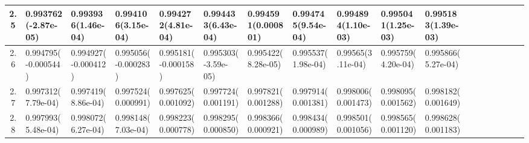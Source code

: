 \documentclass[
	article,			%
	12pt,				%
	twoside,			%
	a4paper,			%
	english,			%
	brazil,				%
	]{abntex2}
\begin{document}
\begin{landscape}
\begin{table}
\begin{tabular}{c||p{18mm}|p{18mm}|p{18mm}|p{18mm}|p{18mm}|p{18mm}|p{18mm}|p{18mm}|p{18mm}|p{18mm}|p{18mm}|p{18mm}|p{18mm}|p{18mm}|p{18mm}|p{18mm}|p{18mm}}
    			2.5 &0.993762\newline(-2.87e-05)&0.993936\newline(1.46e-04)&0.994106\newline(3.15e-04)&0.994272\newline(4.81e-04)&0.994433\newline(6.43e-04)&0.994591\newline(0.000801)&0.994745\newline(9.54e-04)&0.994894\newline(1.10e-03)&0.995041\newline(1.25e-03)&0.995183\newline(1.39e-03)\\\hline
    			2.6 & 0.994795\newline(-0.000544)&0.994927\newline(-0.000412)&0.995056\newline(-0.000283)&0.995181\newline(-0.000158)&0.995303\newline(-3.59e-05)&0.995422\newline(8.28e-05)&0.995537\newline(1.98e-04)&0.99565\newline(3.11e-04)&0.995759\newline(4.20e-04)&0.995866\newline(5.27e-04)\\\hline
    			2.7 &0.997312\newline( 7.79e-04)&0.997419\newline(8.86e-04)&0.997524\newline(0.000991)&0.997625\newline(0.001092)&0.997724\newline(0.001191)&0.997821\newline(0.001288)&0.997914\newline(0.001381)&0.998006\newline(0.001473)&0.998095\newline(0.001562)&0.998182\newline(0.001649)\\\hline
    			2.8 &0.997993\newline( 5.48e-04)&0.998072\newline( 6.27e-04)&0.998148\newline(7.03e-04)&0.998223\newline(0.000778)&0.998295\newline(0.000850)&0.998366\newline(0.000921)&0.998434\newline(0.000989)&0.998501\newline(0.001056)&0.998565\newline(0.001120)&0.998628\newline(0.001183)\\\hline

\end{tabular}
\end{table}
\end{landscape}
\end{document}
